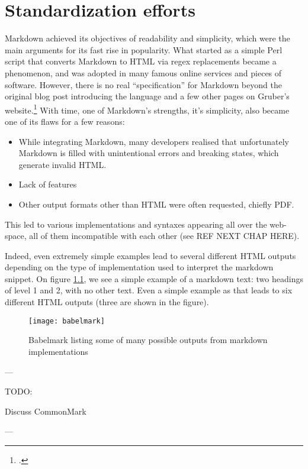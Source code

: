\chapter{Standardization efforts}

\vspace{1cm}

Markdown achieved its objectives of readability and simplicity, which were the main arguments for its fast rise in popularity.
What started as a simple Perl script that converts Markdown to HTML via regex replacements became a phenomenon, and was adopted in many
famous online services and pieces of software. However, there is no real ``specification'' for Markdown beyond the original blog post
introducing the language and a few other pages on Gruber's website.\footcite{gruber2004markdown}
With time, one of Markdown's strengths, it's simplicity, also became one of its flaws for a few reasons:

\begin{itemize}
    \item While integrating Markdown, many developers realised that unfortunately Markdown is filled with unintentional errors
    and breaking states, which generate invalid HTML.
    \item Lack of features
    \item Other output formats other than HTML were often requested, chiefly PDF.
\end{itemize}

This led to various implementations and syntaxes appearing all over the web-space, all of them incompatible with each other
(see REF NEXT CHAP HERE).\newline

Indeed, even extremely simple examples lead to several different HTML outputs depending on the type of implementation used to
interpret the markdown snippet. On figure \ref{fig:babelmark}, we see a simple example of a markdown text: two headings of
level 1 and 2, with no other text. Even a simple example as that leads to six different HTML outputs (three are shown in the figure).

\begin{figure}[H]
\centering
\texttt{[image: babelmark]}
\caption{Babelmark listing some of many possible outputs from markdown implementations}
\label{fig:babelmark}
\end{figure}

---

TODO:

Discuss CommonMark

---

\cite{leonard2016text}